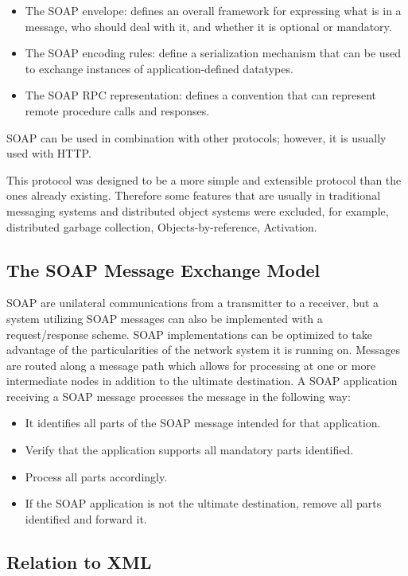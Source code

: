 \documentclass[conference]{IEEEtran}
\begin{document}
\begin{itemize}
  \item The SOAP envelope: defines an overall framework for expressing what is in a message, who should deal with it, and whether it is optional or mandatory.
  \item The SOAP encoding rules: define a serialization mechanism that can be used to exchange instances of application-defined datatypes.
  \item The SOAP RPC representation: defines a convention that can represent remote procedure calls and responses.
\end{itemize}


SOAP can be used in combination with other protocols; however, it is usually used with HTTP.

This protocol was designed to be a more simple and extensible protocol than the ones already existing. Therefore some features that are usually in traditional messaging systems and distributed object systems were excluded, for example, distributed garbage collection, Objects-by-reference, Activation.

\subsection{The SOAP Message Exchange Model}

SOAP are unilateral communications from a transmitter to a receiver, but a system utilizing SOAP messages can also be implemented with a request/response scheme.
SOAP implementations can be optimized to take advantage of the particularities of the network system it is running on.
Messages are routed along a message path which allows for processing at one or more intermediate nodes in addition to the ultimate destination.
A SOAP application receiving a SOAP message processes the message in the following way:

\begin{itemize}
  \item It identifies all parts of the SOAP message intended for that application.
  \item Verify that the application supports all mandatory parts identified.
  \item Process all parts accordingly.
  \item If the SOAP application is not the ultimate destination, remove all parts identified and forward it.
\end{itemize}

\subsection{Relation to XML}
\end{document}
